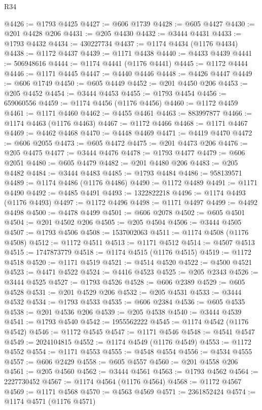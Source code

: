 \begin{lexlean}{R34}
\begin{coremodule}
@4426 := @1793 @4425
@4427 := @606 @1739
@4428 := @605 @4427
@4430 := @201 @4428 @206
@4431 := @205 @4430
@4432 := @3444 @4431
@4433 := @1793 @4432
@4434 := 430227734
@4437 := @1174 @4434 (@1176 @4434)
@4438 := @1172 @4437
@4439 := @1171 @4438
@4440 := @4433 @4439
@4441 := 506948616
@4444 := @1174 @4441 (@1176 @4441)
@4445 := @1172 @4444
@4446 := @1171 @4445
@4447 := @4440 @4446
@4448 := @4426 @4447
@4449 := @606 @1749
@4450 := @605 @4449
@4452 := @201 @4450 @206
@4453 := @205 @4452
@4454 := @3444 @4453
@4455 := @1793 @4454
@4456 := 659060556
@4459 := @1174 @4456 (@1176 @4456)
@4460 := @1172 @4459
@4461 := @1171 @4460
@4462 := @4455 @4461
@4463 := 883997877
@4466 := @1174 @4463 (@1176 @4463)
@4467 := @1172 @4466
@4468 := @1171 @4467
@4469 := @4462 @4468
@4470 := @4448 @4469
@4471 := @4419 @4470
@4472 := @606 @2055
@4473 := @605 @4472
@4475 := @201 @4473 @206
@4476 := @205 @4475
@4477 := @3444 @4476
@4478 := @1793 @4477
@4479 := @606 @2051
@4480 := @605 @4479
@4482 := @201 @4480 @206
@4483 := @205 @4482
@4484 := @3444 @4483
@4485 := @1793 @4484
@4486 := 958139571
@4489 := @1174 @4486 (@1176 @4486)
@4490 := @1172 @4489
@4491 := @1171 @4490
@4492 := @4485 @4491
@4493 := 1322822218
@4496 := @1174 @4493 (@1176 @4493)
@4497 := @1172 @4496
@4498 := @1171 @4497
@4499 := @4492 @4498
@4500 := @4478 @4499
@4501 := @606 @2078
@4502 := @605 @4501
@4504 := @201 @4502 @206
@4505 := @205 @4504
@4506 := @3444 @4505
@4507 := @1793 @4506
@4508 := 1537002063
@4511 := @1174 @4508 (@1176 @4508)
@4512 := @1172 @4511
@4513 := @1171 @4512
@4514 := @4507 @4513
@4515 := 1747873779
@4518 := @1174 @4515 (@1176 @4515)
@4519 := @1172 @4518
@4520 := @1171 @4519
@4521 := @4514 @4520
@4522 := @4500 @4521
@4523 := @4471 @4522
@4524 := @4416 @4523
@4525 := @205 @2343
@4526 := @3444 @4525
@4527 := @1793 @4526
@4528 := @606 @2389
@4529 := @605 @4528
@4531 := @201 @4529 @206
@4532 := @205 @4531
@4533 := @3444 @4532
@4534 := @1793 @4533
@4535 := @606 @2384
@4536 := @605 @4535
@4538 := @201 @4536 @206
@4539 := @205 @4538
@4540 := @3444 @4539
@4541 := @1793 @4540
@4542 := 1955562222
@4545 := @1174 @4542 (@1176 @4542)
@4546 := @1172 @4545
@4547 := @1171 @4546
@4548 := @4541 @4547
@4549 := 2024104815
@4552 := @1174 @4549 (@1176 @4549)
@4553 := @1172 @4552
@4554 := @1171 @4553
@4555 := @4548 @4554
@4556 := @4534 @4555
@4557 := @606 @2429
@4558 := @605 @4557
@4560 := @201 @4558 @206
@4561 := @205 @4560
@4562 := @3444 @4561
@4563 := @1793 @4562
@4564 := 2227730452
@4567 := @1174 @4564 (@1176 @4564)
@4568 := @1172 @4567
@4569 := @1171 @4568
@4570 := @4563 @4569
@4571 := 2361852424
@4574 := @1174 @4571 (@1176 @4571)

\end{coremodule}
\end{lexlean}
